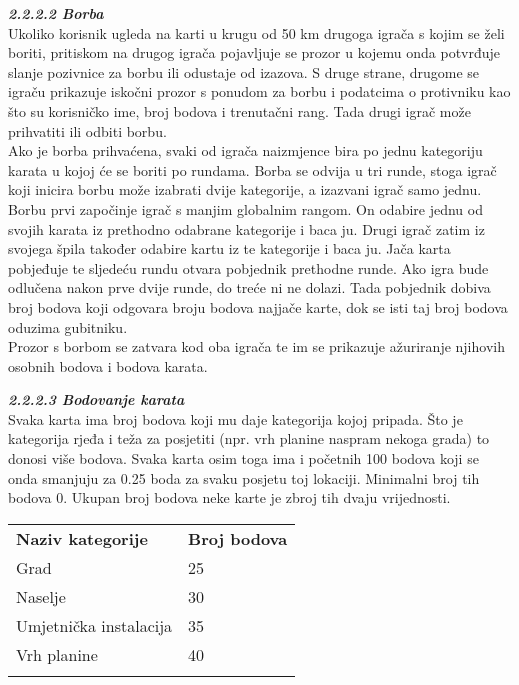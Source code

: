 		\textbf{\textit{\small2.2.2.2 Borba}}\\
		{   Ukoliko korisnik ugleda na karti u krugu od 50 km drugoga igrača s kojim se želi boriti, pritiskom na drugog igrača pojavljuje se prozor u kojemu onda potvrđuje slanje pozivnice za borbu ili odustaje od izazova. S druge strane, drugome se  igraču prikazuje iskočni prozor s ponudom za borbu i podatcima o protivniku kao što su korisničko ime, broj bodova i trenutačni rang. Tada drugi igrač može prihvatiti ili odbiti borbu. \\ Ako je borba prihvaćena, svaki od igrača naizmjence bira po jednu kategoriju karata u kojoj će se boriti po rundama. Borba se odvija u tri runde, stoga igrač koji inicira borbu može izabrati dvije kategorije, a izazvani igrač samo jednu. Borbu prvi započinje igrač s manjim globalnim rangom. On odabire jednu od svojih karata iz prethodno odabrane kategorije i baca ju. Drugi igrač zatim iz svojega špila također odabire kartu iz te kategorije i baca ju. Jača karta pobjeđuje te sljedeću rundu otvara pobjednik prethodne runde. Ako igra bude odlučena nakon prve dvije runde, do treće ni ne dolazi. Tada pobjednik dobiva broj bodova koji odgovara broju bodova najjače karte, dok se isti taj broj bodova oduzima gubitniku.\\ Prozor s borbom se zatvara kod oba igrača te im se prikazuje ažuriranje njihovih osobnih bodova i bodova karata.\\}
		
		
		\textbf{\textit{\small2.2.2.3 Bodovanje karata}}\\
		{Svaka karta ima broj bodova koji mu daje kategorija kojoj pripada. Što je kategorija rjeđa i teža za posjetiti (npr. vrh planine naspram nekoga grada) to donosi više bodova. Svaka karta osim toga ima i početnih 100 bodova koji se onda smanjuju za 0.25 boda za svaku posjetu toj lokaciji. Minimalni broj tih bodova 0. Ukupan broj bodova neke karte je zbroj tih dvaju vrijednosti.\\ }
		
		
		\begin{tabular}{ll}
			\textbf{Naziv kategorije} & \textbf{Broj bodova} \\
			Grad                      & 25                   \\
			Naselje                   & 30                   \\
			Umjetnička instalacija    & 35                   \\
			Vrh planine               & 40                   \\
				&                     
		\end{tabular}
		
		
		\eject
	